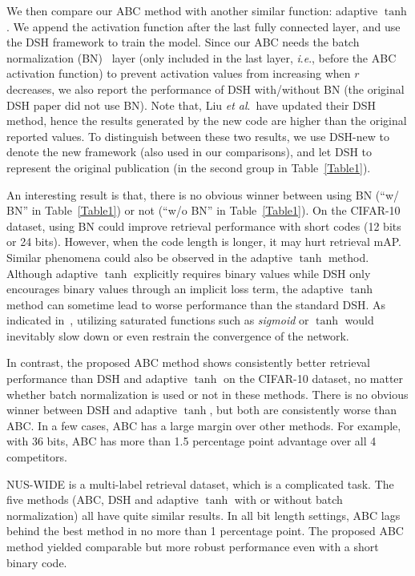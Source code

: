 \documentclass[runningheads]{llncs}
\newcommand{\etal}{\textit{et al}.}
\newcommand{\ie}{\textit{i}.\textit{e}.}
\begin{document}
We then compare our ABC method with another similar function: adaptive $\tanh$. We append the activation function after the last fully connected layer, and use the DSH framework to train the model. Since our ABC needs the batch normalization (BN)~\cite{bn} layer (only included in the last layer, \ie, before the ABC activation function) to prevent activation values from increasing when $r$ decreases, we also report the performance of DSH with/without BN (the original DSH paper did not use BN). Note that, Liu \etal~have updated their DSH method, hence the results generated by the new code are higher than the original reported values. To distinguish between these two results, we use DSH-new to denote the new framework (also used in our comparisons), and let DSH to represent the original publication (in the second group in Table~\ref{Table1}).

An interesting result is that, there is no obvious winner between using BN (``w/ BN'' in Table~\ref{Table1}) or not (``w/o BN'' in Table~\ref{Table1}). On the CIFAR-10 dataset, using BN could improve retrieval performance with short codes (12 bits or 24 bits). However, when the code length is longer, it may hurt retrieval mAP. Similar phenomena could also be observed in the adaptive $\tanh$ method. Although adaptive $\tanh$ explicitly requires binary values while DSH only encourages binary values through an implicit loss term, the adaptive $\tanh$ method can sometime lead to worse performance than the standard DSH. As indicated in~\cite{Liu16CVPR_r12}, utilizing saturated functions such as \emph{sigmoid} or $\tanh$ would inevitably slow down or even restrain the convergence of the network. 

In contrast, the proposed ABC method shows consistently better retrieval performance than DSH and adaptive $\tanh$ on the CIFAR-10 dataset, no matter whether batch normalization is used or not in these methods. There is no obvious winner between DSH and adaptive $\tanh$, but both are consistently worse than ABC. In a few cases, ABC has a large margin over other methods. For example, with 36 bits, ABC has more than 1.5 percentage point advantage over all 4 competitors.

NUS-WIDE is a multi-label retrieval dataset, which is a complicated task. The five methods (ABC, DSH and adaptive $\tanh$ with or without batch normalization) all have quite similar results. In all bit length settings, ABC lags behind the best method in no more than 1 percentage point. The proposed ABC method yielded comparable but more robust performance even with a short binary code.
\end{document}
